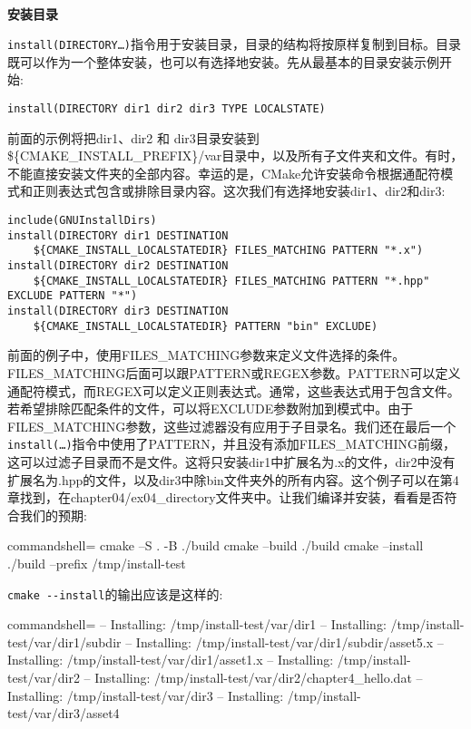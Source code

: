 \hspace*{\fill} \\ %
\noindent
\textbf{安装目录}

\texttt{install(DIRECTORY…)}指令用于安装目录，目录的结构将按原样复制到目标。目录既可以作为一个整体安装，也可以有选择地安装。先从最基本的目录安装示例开始:

\begin{lstlisting}[style=styleCMake]
install(DIRECTORY dir1 dir2 dir3 TYPE LOCALSTATE)
\end{lstlisting}

前面的示例将把dir1、dir2 和 dir3目录安装到\$\{CMAKE\_INSTALL\_PREFIX\}/var目录中，以及所有子文件夹和文件。有时，不能直接安装文件夹的全部内容。幸运的是，CMake允许安装命令根据通配符模式和正则表达式包含或排除目录内容。这次我们有选择地安装dir1、dir2和dir3:

\begin{lstlisting}[style=styleCMake]
include(GNUInstallDirs)
install(DIRECTORY dir1 DESTINATION
	${CMAKE_INSTALL_LOCALSTATEDIR} FILES_MATCHING PATTERN "*.x")
install(DIRECTORY dir2 DESTINATION
	${CMAKE_INSTALL_LOCALSTATEDIR} FILES_MATCHING PATTERN "*.hpp"
EXCLUDE PATTERN "*")
install(DIRECTORY dir3 DESTINATION
	${CMAKE_INSTALL_LOCALSTATEDIR} PATTERN "bin" EXCLUDE)
\end{lstlisting}

前面的例子中，使用FILES\_MATCHING参数来定义文件选择的条件。FILES\_MATCHING后面可以跟PATTERN或REGEX参数。PATTERN可以定义通配符模式，而REGEX可以定义正则表达式。通常，这些表达式用于包含文件。若希望排除匹配条件的文件，可以将EXCLUDE参数附加到模式中。由于FILES\_MATCHING参数，这些过滤器没有应用于子目录名。我们还在最后一个\texttt{install(…)}指令中使用了PATTERN，并且没有添加FILES\_MATCHING前缀，这可以过滤子目录而不是文件。这将只安装dir1中扩展名为.x的文件，dir2中没有扩展名为.hpp的文件，以及dir3中除bin文件夹外的所有内容。这个例子可以在第4章找到，在chapter04/ex04\_directory文件夹中。让我们编译并安装，看看是否符合我们的预期:

\begin{tcblisting}{commandshell={}}
cmake –S . -B ./build
cmake –build ./build
cmake –install ./build –prefix /tmp/install-test
\end{tcblisting}

\texttt{cmake -{}-install}的输出应该是这样的:

\begin{tcblisting}{commandshell={}}
-- Installing: /tmp/install-test/var/dir1
-- Installing: /tmp/install-test/var/dir1/subdir
-- Installing: /tmp/install-test/var/dir1/subdir/asset5.x
-- Installing: /tmp/install-test/var/dir1/asset1.x
-- Installing: /tmp/install-test/var/dir2
-- Installing: /tmp/install-test/var/dir2/chapter4_hello.dat
-- Installing: /tmp/install-test/var/dir3
-- Installing: /tmp/install-test/var/dir3/asset4
\end{tcblisting}

